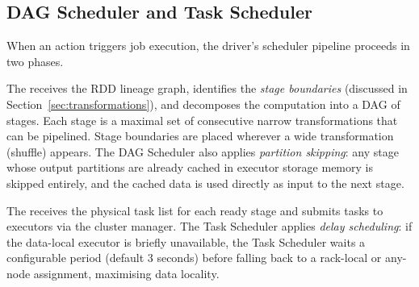 \subsection{DAG Scheduler and Task Scheduler}
\label{subsec:dag-task-sched}

When an action triggers job execution, the driver's scheduler pipeline
proceeds in two phases.

The  receives the RDD lineage graph, identifies the
\emph{stage boundaries} (discussed in Section~\ref{sec:transformations}),
and decomposes the computation into a DAG of stages. Each stage is a
maximal set of consecutive narrow transformations that can be pipelined.
Stage boundaries are placed wherever a wide transformation (shuffle)
appears. The DAG Scheduler also applies \emph{partition skipping}: any
stage whose output partitions are already cached in executor storage memory
is skipped entirely, and the cached data is used directly as input to the
next stage.

The  receives the physical task list for each ready
stage and submits tasks to executors via the cluster manager. The Task
Scheduler applies \emph{delay scheduling}: if the data-local executor is
briefly unavailable, the Task Scheduler waits a configurable period
(default 3 seconds) before falling back to a rack-local or
any-node assignment, maximising data locality.

